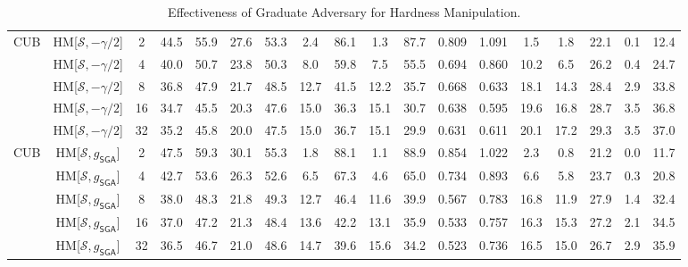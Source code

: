 \begin{table*}
{\begin{tabular}{c|cc|cccc|ccccc|ccccc|c}
	\midrule

\multirow{5}{*}{CUB} & HM{[}$\mathcal{S},-\gamma/2${]} & 2 & 44.5 & 55.9 & 27.6 & 53.3 & 2.4 & 86.1 & 1.3 & 87.7 & 0.809 & 1.091 & 1.5 & 1.8 & 22.1 & 0.1 & 12.4\tabularnewline
 & HM{[}$\mathcal{S},-\gamma/2${]} & 4 & 40.0 & 50.7 & 23.8 & 50.3 & 8.0 & 59.8 & 7.5 & 55.5 & 0.694 & 0.860 & 10.2 & 6.5 & 26.2 & 0.4 & 24.7\tabularnewline
 & HM{[}$\mathcal{S},-\gamma/2${]} & 8 & 36.8 & 47.9 & 21.7 & 48.5 & 12.7 & 41.5 & 12.2 & 35.7 & 0.668 & 0.633 & 18.1 & 14.3 & 28.4 & 2.9 & 33.8\tabularnewline
 & HM{[}$\mathcal{S},-\gamma/2${]} & 16 & 34.7 & 45.5 & 20.3 & 47.6 & 15.0 & 36.3 & 15.1 & 30.7 & 0.638 & 0.595 & 19.6 & 16.8 & 28.7 & 3.5 & 36.8\tabularnewline
 & HM{[}$\mathcal{S},-\gamma/2${]} & 32 & 35.2 & 45.8 & 20.0 & 47.5 & 15.0 & 36.7 & 15.1 & 29.9 & 0.631 & 0.611 & 20.1 & 17.2 & 29.3 & 3.5 & 37.0\tabularnewline
\hline
\multirow{5}{*}{CUB} & HM{[}$\mathcal{S},g_{\mathsf{SGA}}${]} & 2 & 47.5 & 59.3 & 30.1 & 55.3 & 1.8 & 88.1 & 1.1 & 88.9 & 0.854 & 1.022 & 2.3 & 0.8 & 21.2 & 0.0 & 11.7\tabularnewline
 & HM{[}$\mathcal{S},g_{\mathsf{SGA}}${]} & 4 & 42.7 & 53.6 & 26.3 & 52.6 & 6.5 & 67.3 & 4.6 & 65.0 & 0.734 & 0.893 & 6.6 & 5.8 & 23.7 & 0.3 & 20.8\tabularnewline
 & HM{[}$\mathcal{S},g_{\mathsf{SGA}}${]} & 8 & 38.0 & 48.3 & 21.8 & 49.3 & 12.7 & 46.4 & 11.6 & 39.9 & 0.567 & 0.783 & 16.8 & 11.9 & 27.9 & 1.4 & 32.4\tabularnewline
 & HM{[}$\mathcal{S},g_{\mathsf{SGA}}${]} & 16 & 37.0 & 47.2 & 21.3 & 48.4 & 13.6 & 42.2 & 13.1 & 35.9 & 0.533 & 0.757 & 16.3 & 15.3 & 27.2 & 2.1 & 34.5\tabularnewline
 & HM{[}$\mathcal{S},g_{\mathsf{SGA}}${]} & 32 & 36.5 & 46.7 & 21.0 & 48.6 & 14.7 & 39.6 & 15.6 & 34.2 & 0.523 & 0.736 & 16.5 & 15.0 & 26.7 & 2.9 & 35.9\tabularnewline

	\bottomrule
\end{tabular}}

\caption{Effectiveness of Graduate Adversary for Hardness Manipulation.}
\label{tab:ga}
\end{table*}
